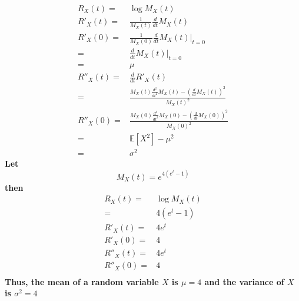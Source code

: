 \documentclass{article}
\begin{document}
        \paragraph{
            \begin{equation*}
                \begin{split}
                    R_X(t)=&\log M_X(t)\\
                    R'_X(t)=&\frac{1}{M_X(t)}\frac{d}{dt}M_X(t)\\  
                    R'_X(0)=&\frac{1}{M_X(0)}\frac{d}{dt}M_X(t)|_{t=0}\\
                        =&\frac{d}{dt}M_X(t)|_{t=0}\\
                        =&\mu\\
                    R''_X(t)=&\frac{d}{dt}R'_X(t)\\   
                        =&\frac{M_X(t)\frac{d^2}{dt^2}M_X(t)-(\frac{d}{dt}M_X(t))^2}{M_X(t)^2}\\
                    R''_X(0)=&\frac{M_X(0)\frac{d^2}{dt^2}M_X(0)-(\frac{d}{dt}M_X(0))^2}{M_X(0)^2}\\
                        =&\mathbb{E}[X^2]-\mu^2\\
                        =&\sigma^2
                \end{split}
            \end{equation*}
            Let $$M_X(t)=e^{4(e^t-1)}$$
            then
            \begin{equation*}
                \begin{split}
                    R_X(t)=&\log M_X(t)\\  
                        =&4(e^t-1)\\
                    R'_X(t)=&4e^t\\
                    R'_X(0)=&4\\
                    R''_X(t)=&4e^t\\
                    R''_X(0)=&4\\
                \end{split}
            \end{equation*}
            Thus, the mean of a random variable $X$ is $\mu=4$ and the variance of $X$ is $\sigma^2=4$
        } 
    \section{}
\end{document}
